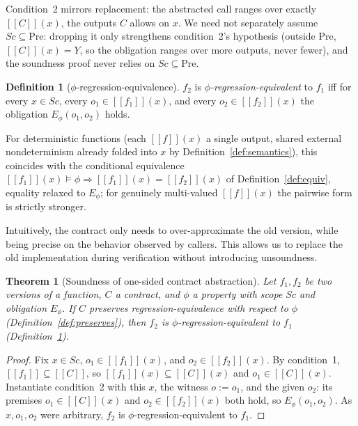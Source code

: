 \documentclass[conference]{IEEEtran}
\newtheorem{theorem}{Theorem}
\theoremstyle{definition}
\newtheorem{definition}{Definition}
\theoremstyle{remark}
\newcommand{\sem}[1]{[\![#1]\!]}
\begin{document}
Condition~2 mirrors replacement: the abstracted call ranges over exactly
$\sem{C}(x)$, the outputs $C$ allows on $x$. We need not separately
assume $\mathit{Sc}\subseteq\text{Pre}$: dropping it only strengthens
condition~2's hypothesis (outside $\text{Pre}$, $\sem{C}(x)=Y$, so the
obligation ranges over more outputs, never fewer), and the soundness
proof never relies on $\mathit{Sc}\subseteq\text{Pre}$.
\begin{definition}[$\phi$-regression-equivalence]\label{def:regequiv}
  $f_2$ is \emph{$\phi$-regression-equivalent} to $f_1$ iff for every
  $x\in\mathit{Sc}$, every $o_1\in\sem{f_1}(x)$, and every
  $o_2\in\sem{f_2}(x)$ the obligation $E_\phi(o_1,o_2)$ holds.
\end{definition}
For
deterministic functions (each $\sem{f}(x)$ a single output, shared
  external nondeterminism already folded into $x$ by
Definition~\ref{def:semantics}), this
coincides with the conditional equivalence
$\sem{f_1}(x)\models\phi\Rightarrow\sem{f_1}(x)=\sem{f_2}(x)$ of
Definition~\ref{def:equiv}, equality relaxed to $E_\phi$; for genuinely
multi-valued $\sem{f}(x)$
the pairwise form is strictly stronger.


Intuitively, the contract only needs to over-approximate the old
version, while being precise on the behavior observed by callers.
This allows us to replace the old implementation during verification
without introducing unsoundness.

\begin{theorem}[Soundness of one-sided contract abstraction]\label{thm:t1}
  Let $f_1,f_2$ be two versions of a function, $C$ a contract, and $\phi$
  a property with scope $\mathit{Sc}$ and obligation $E_\phi$. If $C$
  preserves regression-equivalence with respect to $\phi$
  (Definition~\ref{def:preserves}), then $f_2$ is
  $\phi$-regression-equivalent to $f_1$ (Definition~\ref{def:regequiv}).
\end{theorem}
\begin{proof}
  Fix $x\in\mathit{Sc}$, $o_1\in\sem{f_1}(x)$, and
  $o_2\in\sem{f_2}(x)$. By condition~1, $\sem{f_1}\subseteq\sem{C}$, so
  $\sem{f_1}(x)\subseteq\sem{C}(x)$ and $o_1\in\sem{C}(x)$. Instantiate
  condition~2 with this $x$, the witness $o\mathbin{:=}o_1$, and the
  given $o_2$: its premises $o_1\in\sem{C}(x)$ and $o_2\in\sem{f_2}(x)$
  both hold, so $E_\phi(o_1,o_2)$. As $x,o_1,o_2$ were arbitrary, $f_2$
  is $\phi$-regression-equivalent to $f_1$.
\end{proof}
\end{document}
